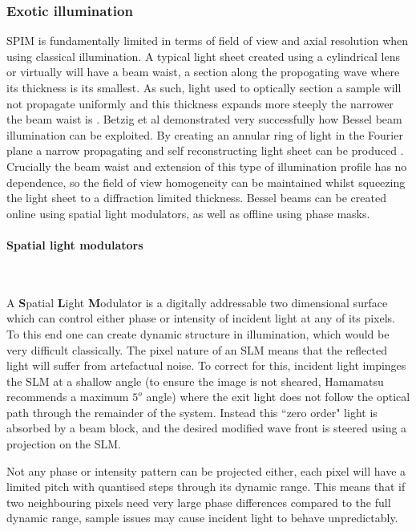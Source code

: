 \subsubsection{Exotic illumination}

SPIM is fundamentally limited in terms of field of view and axial resolution when using classical illumination. A typical light sheet created using a cylindrical lens or virtually will have a beam waist, a section along the propogating wave where its thickness is its smallest. As such, light used to optically section a sample will not propagate uniformly and this thickness expands more steeply the narrower the beam waist is \cite{Silfvast2004}.  Betzig et al demonstrated very successfully how Bessel beam illumination can be exploited. By creating an annular ring of light in the Fourier plane a narrow propagating and self reconstructing light sheet can be produced \cite{Chen2014}. Crucially the beam waist and extension of this type of illumination profile has no dependence, so the field of view homogeneity can be maintained whilst squeezing the light sheet to a diffraction limited thickness. Bessel beams can be created online using spatial light modulators, as well as offline using phase masks.

\paragraph{Spatial light modulators}~

A \textbf{S}patial \textbf{L}ight \textbf{M}odulator is a digitally addressable two dimensional surface which can control either phase or intensity of incident light at any of its pixels. To this end one can create dynamic structure in illumination, which would be very difficult classically. %
The pixel nature of an SLM means that the reflected light will suffer from artefactual noise. To correct for this, incident light impinges the SLM at a shallow angle (to ensure the image is not sheared, Hamamatsu recommends a maximum $5^o$ angle)  where the exit light does not follow the optical path through the remainder of the system. Instead this ``zero order" light is absorbed by a beam block, and the desired modified wave front is steered using a projection on the SLM.

Not any phase or intensity pattern can be projected either, each pixel will have a limited pitch with quantised steps through its dynamic range. This means that if two neighbouring pixels need very large phase differences compared to the full dynamic range, sample issues may cause incident light to behave unpredictably.

